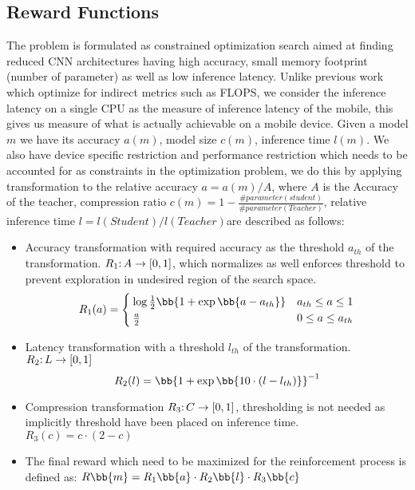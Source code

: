 \documentclass[../main]{subfiles}
\begin{document}
    \subsection{Reward Functions}
    \label{sec:reward}
        The problem is formulated as constrained optimization search aimed at finding reduced CNN architectures having high accuracy, small memory footprint (number of parameter) as well as low inference latency.
        Unlike previous work which optimize for indirect metrics such as FLOPS, we consider the inference latency on a single CPU as the measure of inference latency of the mobile, this gives us measure of what is actually achievable on a mobile device.
        Given a model $m$ we have its accuracy $a(m)$, model size $c(m)$, inference time $l(m)$.
        We also have device specific restriction and performance restriction which needs to be accounted for as constraints in the optimization problem, we do this by applying transformation to the relative accuracy $a = a(m)/A$, where $A$ is the Accuracy of the teacher, compression ratio $c(m) =  1 -\frac{\#parameter(student)}{\#parameter(Teacher)}$, relative inference time $l = l(Student)/l(Teacher) $are described as follows:
        \begin{itemize}
            \item Accuracy transformation with required accuracy as the threshold $a_{th}$ of the transformation.
            $R_1\mathpunct{:} A \rightarrow [0,1]$, which normalizes as well enforces threshold to prevent exploration in undesired region of the search space.
            \begin{equation}
                R_1(a) =    \begin{cases}
                                \log \frac{1}{2}\bb{1 + \exp\bb{a-a_{th}}}  &   a_{th} \leq a \leq 1    \\
                                \frac{a}{2}                                 &   0 \leq a \leq a_{th}
                            \end{cases}
            \end{equation}
        
            \item Latency transformation with a threshold $l_{th}$ of the transformation.
            $R_2\mathpunct{:} L \rightarrow [0,1]$
            \begin{equation}
                R_2(l) =  \inv{\bb{1 + \exp\bb{10 \cdot (l-l_{th})}}}
            \end{equation}
        
            \item Compression transformation $R_3\mathpunct{:} C \rightarrow [0,1]$, thresholding is not needed as implicitly threshold have been placed on inference time.
            $R_3(c) = c \cdot (2 -c)$
            \item The final reward which need to be maximized for the reinforcement process is defined as:
            $R \bb{m} = R_1 \bb{a} \cdot R_2 \bb{l} \cdot R_3 \bb{c} $
        \end{itemize}
\end{document}
